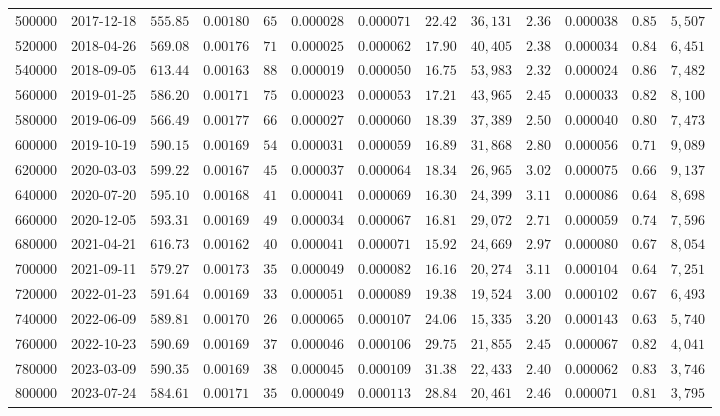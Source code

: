 \begin{tabular}{rllllllllllll}
\toprule
\midrule
500000 & 2017-12-18 & $555.85$ & $0.00180$ & $65$ & $0.000028$ & $0.000071$ & $22.42$ & $36,131$ & $2.36$ & $0.000038$ & $0.85$ & $5,507$ \\
520000 & 2018-04-26 & $569.08$ & $0.00176$ & $71$ & $0.000025$ & $0.000062$ & $17.90$ & $40,405$ & $2.38$ & $0.000034$ & $0.84$ & $6,451$ \\
540000 & 2018-09-05 & $613.44$ & $0.00163$ & $88$ & $0.000019$ & $0.000050$ & $16.75$ & $53,983$ & $2.32$ & $0.000024$ & $0.86$ & $7,482$ \\
560000 & 2019-01-25 & $586.20$ & $0.00171$ & $75$ & $0.000023$ & $0.000053$ & $17.21$ & $43,965$ & $2.45$ & $0.000033$ & $0.82$ & $8,100$ \\
580000 & 2019-06-09 & $566.49$ & $0.00177$ & $66$ & $0.000027$ & $0.000060$ & $18.39$ & $37,389$ & $2.50$ & $0.000040$ & $0.80$ & $7,473$ \\
600000 & 2019-10-19 & $590.15$ & $0.00169$ & $54$ & $0.000031$ & $0.000059$ & $16.89$ & $31,868$ & $2.80$ & $0.000056$ & $0.71$ & $9,089$ \\
620000 & 2020-03-03 & $599.22$ & $0.00167$ & $45$ & $0.000037$ & $0.000064$ & $18.34$ & $26,965$ & $3.02$ & $0.000075$ & $0.66$ & $9,137$ \\
640000 & 2020-07-20 & $595.10$ & $0.00168$ & $41$ & $0.000041$ & $0.000069$ & $16.30$ & $24,399$ & $3.11$ & $0.000086$ & $0.64$ & $8,698$ \\
660000 & 2020-12-05 & $593.31$ & $0.00169$ & $49$ & $0.000034$ & $0.000067$ & $16.81$ & $29,072$ & $2.71$ & $0.000059$ & $0.74$ & $7,596$ \\
680000 & 2021-04-21 & $616.73$ & $0.00162$ & $40$ & $0.000041$ & $0.000071$ & $15.92$ & $24,669$ & $2.97$ & $0.000080$ & $0.67$ & $8,054$ \\
700000 & 2021-09-11 & $579.27$ & $0.00173$ & $35$ & $0.000049$ & $0.000082$ & $16.16$ & $20,274$ & $3.11$ & $0.000104$ & $0.64$ & $7,251$ \\
720000 & 2022-01-23 & $591.64$ & $0.00169$ & $33$ & $0.000051$ & $0.000089$ & $19.38$ & $19,524$ & $3.00$ & $0.000102$ & $0.67$ & $6,493$ \\
740000 & 2022-06-09 & $589.81$ & $0.00170$ & $26$ & $0.000065$ & $0.000107$ & $24.06$ & $15,335$ & $3.20$ & $0.000143$ & $0.63$ & $5,740$ \\
760000 & 2022-10-23 & $590.69$ & $0.00169$ & $37$ & $0.000046$ & $0.000106$ & $29.75$ & $21,855$ & $2.45$ & $0.000067$ & $0.82$ & $4,041$ \\
780000 & 2023-03-09 & $590.35$ & $0.00169$ & $38$ & $0.000045$ & $0.000109$ & $31.38$ & $22,433$ & $2.40$ & $0.000062$ & $0.83$ & $3,746$ \\
800000 & 2023-07-24 & $584.61$ & $0.00171$ & $35$ & $0.000049$ & $0.000113$ & $28.84$ & $20,461$ & $2.46$ & $0.000071$ & $0.81$ & $3,795$ \\
\bottomrule
\end{tabular}
